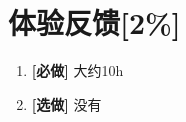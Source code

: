 \documentclass{article}
\begin{document}
\section*{体验反馈[2\%]}

\begin{enumerate}[label=(\alph*), start=1]
    \item \textbf{[必做]} %
    大约10h
    \item \textbf{[选做]} %
    没有
\end{enumerate}
\end{document}
